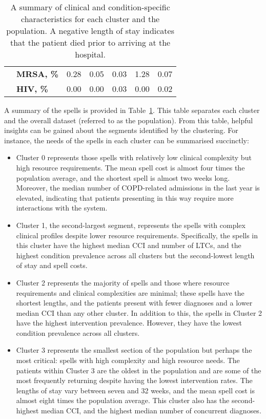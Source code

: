 \begin{table}
{\begin{tabular}{llrrrrr}
               & \textbf{MRSA, \%} &     0.28 &     0.05 &     0.03 &      1.28 &       0.07 \\
               & \textbf{HIV, \%} &     0.00 &     0.00 &     0.03 &      0.00 &       0.02 \\
        \bottomrule
        \end{tabular}
    }\caption{%
        A summary of clinical and condition-specific characteristics for each
        cluster and the population. A negative length of stay indicates that the
        patient died prior to arriving at the hospital.
    }\label{tab:summary}
\end{table}

A summary of the spells is provided in Table~\ref{tab:summary}. This table
separates each cluster and the overall dataset (referred to as the population).
From this table, helpful insights can be gained about the segments identified by
the clustering. For instance, the needs of the spells in each cluster can be
summarised succinctly:
\begin{itemize}
    \item Cluster 0 represents those spells with relatively low clinical
        complexity but high resource requirements. The mean spell cost is almost
        four times the population average, and the shortest spell is almost two
        weeks long. Moreover, the median number of COPD-related admissions in
        the last year is elevated, indicating that patients presenting in this
        way require more interactions with the system.
    \item Cluster 1, the second-largest segment, represents the spells with
        complex clinical profiles despite lower resource requirements.
        Specifically, the spells in this cluster have the highest median CCI and
        number of LTCs, and the highest condition prevalence across all clusters
        but the second-lowest length of stay and spell costs.
    \item Cluster 2 represents the majority of spells and those where resource
        requirements and clinical complexities are minimal; these spells have
        the shortest lengths, and the patients present with fewer diagnoses and
        a lower median CCI than any other cluster. In addition to this, the
        spells in Cluster 2 have the highest intervention prevalence. However,
        they have the lowest condition prevalence across all clusters.
    \item Cluster 3 represents the smallest section of the population but
        perhaps the most critical: spells with high complexity and high resource
        needs. The patients within Cluster 3 are the oldest in the population
        and are some of the most frequently returning despite having the lowest
        intervention rates. The lengths of stay vary between seven and 32 weeks,
        and the mean spell cost is almost eight times the population average.
        This cluster also has the second-highest median CCI, and the highest
        median number of concurrent diagnoses.
\end{itemize}

